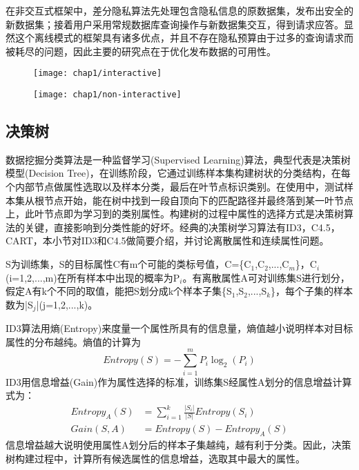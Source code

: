 在非交互式框架中，差分隐私算法先处理包含隐私信息的原数据集，发布出安全的新数据集；接着用户采用常规数据库查询操作与新数据集交互，得到请求应答。显然这个离线模式的框架具有诸多优点，并且不存在隐私预算由于过多的查询请求而被耗尽的问题，因此主要的研究点在于优化发布数据的可用性。

\begin{figure}[!htp]
	\centering
	\texttt{[image: chap1/interactive]}
\end{figure}

\begin{figure}[!htp]
	\centering
	\texttt{[image: chap1/non-interactive]}
\end{figure}


\subsection{决策树} %

数据挖掘分类算法是一种监督学习(Supervised Learning)算法，典型代表是决策树模型(Decision Tree)\cite{decision tree}，在训练阶段，它通过训练样本集构建树状的分类结构，在每个内部节点做属性选取以及样本分类，最后在叶节点标识类别。在使用中，测试样本集从根节点开始，能在树中找到一段自顶向下的匹配路径并最终落到某一叶节点上，此叶节点即为学习到的类别属性。构建树的过程中属性的选择方式是决策树算法的关键，直接影响到分类性能的好坏。经典的决策树学习算法有ID3\cite{decision tree}，C4.5\cite{c45}，CART\cite{cart}，本小节对ID3和C4.5做简要介绍，并讨论离散属性和连续属性问题。

\begin{exmp}
	S为训练集，S的目标属性C有m个可能的类标号值，C=\{C$_{1}$,C$_{2}$,...,C$_{m}$\}，C$_{i}$(i=1,2,...,m)在所有样本中出现的概率为P$_{i}$。有离散属性A可对训练集S进行划分，假定A有k个不同的取值，能把S划分成k个样本子集\{S$_{1}$,S$_{2}$,...,S$_{k}$\}，每个子集的样本数为|S$_{j}$|(j=1,2,...,k)。
\end{exmp}
ID3算法用熵(Entropy)来度量一个属性所具有的信息量，熵值越小说明样本对目标属性的分布越纯。熵值的计算为
\[
	Entropy(S) = -\sum_{i=1}^{m}P_{i}\log_{2}(P_{i})
\]
ID3用信息增益(Gain)作为属性选择的标准，训练集S经属性A划分的信息增益计算式为：
\[
\begin{split}
	Entropy_{A}(S) &= \sum_{i=1}^{k}\frac{|S_{i}|}{|S|}Entropy(S_{i})\\
	Gain(S,A) &= Entropy(S)-Entropy_{A}(S)
\end{split}
\]
信息增益越大说明使用属性A划分后的样本子集越纯，越有利于分类。因此，决策树构建过程中，计算所有候选属性的信息增益，选取其中最大的属性。

